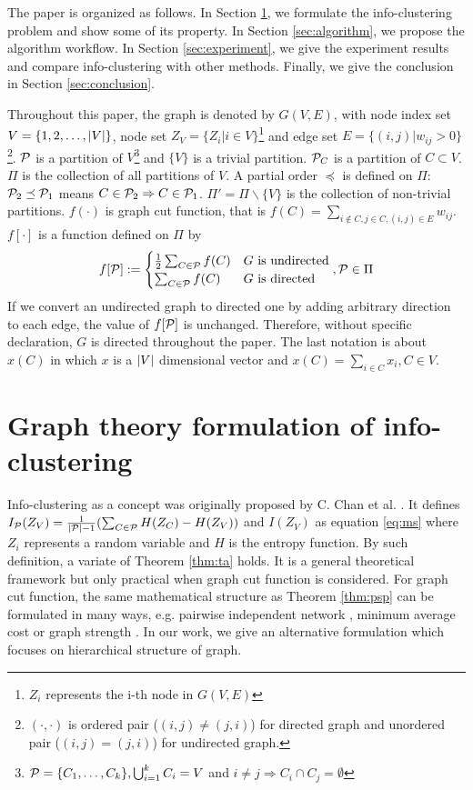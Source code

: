 \documentclass{article}
\begin{document}
The paper is organized as follows. In Section \ref{sec:models}, we formulate the info-clustering problem and show some of its property. In Section \ref{sec:algorithm}, we propose the algorithm workflow. In Section \ref{sec:experiment}, we give the experiment results and compare info-clustering with other methods. Finally, we give the conclusion in Section \ref{sec:conclusion}.

Throughout this paper, the graph is denoted by $G(V,E)$, with node index set $V = \{1, 2, \dots, \abs{V}\}$, node set $Z_V=\{Z_i | i \in V\}$\footnote{$Z_i$ represents the i-th node in $G(V,E)$} 
 and edge set $E=\{(i,j) | w_{ij}>0\}$\footnote{$(\cdot, \cdot)$ is ordered pair ($(i,j) \neq (j,i)$) for directed graph and unordered pair ($(i,j) = (j,i)$) for undirected graph.}. $\P$ is a partition of $V$\footnote{$\P=\{C_1, \dots, C_k\}, \bigcup_{i=1}^k C_i = V$ and $i\neq j \Rightarrow C_i \cap C_j = \emptyset$} and $\{V\}$ is a trivial partition. $\P_C$ is a partition of $C\subset V$. $\Pi$ is the collection of all partitions of $V$. A partial order $\preceq $ is defined on $\Pi$: $\P_2 \preceq \P_1$ means $C\in \P_2 \Rightarrow C \in \P_1$. $\Pi' = \Pi \backslash \{V\}$ is the collection of non-trivial partitions. $f(\cdot)$ is graph cut function, that is $f(C) = \sum_{i\not\in C, j\in C, (i,j) \in E} w_{ij}$. $f[\cdot]$ is a function defined on $\Pi$ by
\begin{equation}
f[\P] :=
\begin{cases}
\frac{1}{2} \sum_{C\in \P}f(C)   & G \textrm{ is undirected} \\
\sum_{C\in \P}f(C)   & G \textrm{ is directed}
\end{cases},\P \in \Pi
\end{equation}
If we convert an undirected graph to directed one by adding arbitrary direction to each edge, the value of $f[\P]$ is unchanged. Therefore, without specific declaration, $G$ is directed throughout the paper. The last notation is about $x(C)$ in which $x$ is a $\abs{V}$ dimensional vector and $x(C)=\sum_{i \in C} x_i, C\in V$.
\section{Graph theory formulation of info-clustering}\label{sec:models}
Info-clustering as a concept was originally proposed by C. Chan et al. \cite{RN1}.
It defines $I_{\P}(Z_V) = \frac{1}{\abs{\P}-1}(\sum_{C\in \P} H(Z_C) - H(Z_V))$ and $I(Z_V)$ as equation \eqref{eq:ms} where $Z_i$ represents a random variable and $H$ is the entropy function. By such definition, a variate of Theorem \ref{thm:ta} holds. 
It is a general theoretical framework but only practical when graph cut function is considered. 
For graph cut function, the same mathematical structure as Theorem \ref{thm:psp} can be formulated in many ways, e.g. pairwise independent network \cite{RN9}, minimum average cost \cite{RN7} or graph strength \cite{RN12}. In our work, we give an alternative formulation which focuses on hierarchical structure of graph. 
\end{document}
